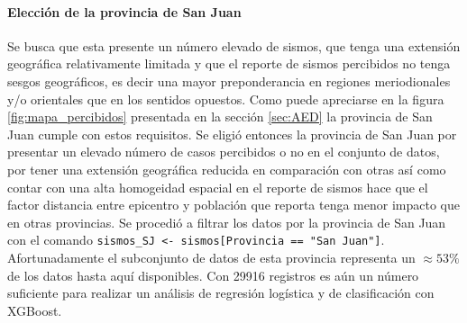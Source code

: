 \documentclass[a4paper]{report}
\begin{document}
\paragraph{Elección de la provincia de San Juan}
Se busca que esta presente un número elevado de sismos, que tenga una extensión geográfica relativamente limitada y que el reporte de sismos percibidos no tenga sesgos geográficos, es decir una mayor preponderancia en regiones meriodionales y/o orientales que en los sentidos opuestos.
Como puede apreciarse en la figura \ref{fig:mapa_percibidos} presentada en la sección \ref{sec:AED} la provincia de San Juan cumple con estos requisitos.
Se eligió entonces la provincia de San Juan por presentar un elevado número de casos percibidos o no en el conjunto de datos, por tener una extensión geográfica reducida en comparación con otras así como contar con una alta homogeidad espacial en el reporte de sismos hace que el factor distancia entre epicentro y población que reporta tenga menor impacto que en otras provincias.
Se procedió a filtrar los datos por la provincia de San Juan con el comando \verb'sismos_SJ <- sismos[Provincia == "San Juan"]'.
Afortunadamente el subconjunto de datos de esta provincia representa un \(\approx 53 \%\) de los datos hasta aquí disponibles.
Con \num{29916} registros es aún un número suficiente para realizar un análisis de regresión logística y de clasificación con XGBoost.
\end{document}

